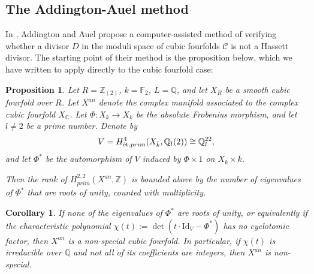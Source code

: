 \documentclass[12pt]{amsart}
\numberwithin{equation}{section}
\theoremstyle{plain}
\newtheorem{proposition}[equation]{Proposition}
\newtheorem{corollary}[equation]{Corollary}
\theoremstyle{remark}
\theoremstyle{definition}
\newcommand{\bQ}{\mathbb{Q}}
\newcommand{\bZ}{\mathbb{Z}}
\newcommand{\bF}{\mathbb{F}}
\newcommand{\bC}{\mathbb{C}}
\newcommand{\calC}{\mathcal{C}}
\newcommand{\et}{\textup{\'et}}
\newcommand{\Id}{\mathrm{Id}}
\begin{document}
\subsection{The Addington-Auel method}\label{subsec: AA method}

In \cite{AA}, Addington and Auel propose a computer-assisted method of verifying whether a divisor $D$ in the moduli space of cubic fourfolds $\calC$ is not a Hassett divisor. The starting point of their method is the proposition below, which we have written to apply directly to the cubic fourfold case:

\begin{proposition}\label{prop: char poly} \cite[Proposition 2.1]{AA}
    Let $R=\bZ_{(2)}$, $k=\bF_2$, $L=\bQ$, and let $X_R$ be a smooth cubic fourfold over $R$. 
    Let $X^{an}$ denote the complex manifold associated to the complex cubic fourfold $X_{\bC}$. 
    Let $\Phi: X_k\rightarrow X_k$ be the absolute Frobenius morphism, and let $l\neq 2$ be a prime number. 
    Denote by
    $$V=H^4_{\et,prim}(X_{\bar{k}},\bQ_l(2))\cong\bQ_l^{22},$$ and let $\Phi^*$ be the automorphism of $V$ induced by $\Phi\times 1$ on $X_k\times \bar{k}$. 
    
    Then the rank of $H^{2,2}_{prim}(X^{an},\bZ)$ is bounded above by the number of eigenvalues of $\Phi^*$ that are roots of unity, counted with multiplicity.
\end{proposition}

\begin{corollary} \cite[Section 2]{AA} \label{non-special}
    If none of the eigenvalues of $\Phi^*$ are roots of unity, or equivalently if the characteristic polynomial $\chi(t):=\det(t\cdot\Id_V-\Phi^*)$ has no cyclotomic factor, then $X^{an}$ is a non-special cubic fourfold. In particular, if $\chi(t)$ is irreducible over $\bQ$ and not all of its coefficients are integers, then $X^{an}$ is non-special.
\end{corollary}
\end{document}
